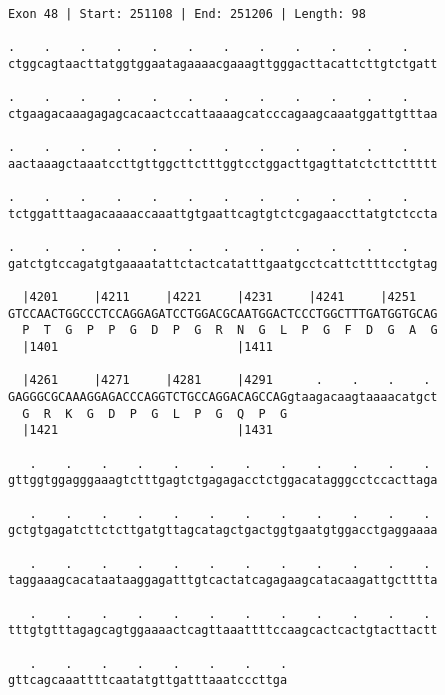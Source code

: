 \documentclass{article}
\begin{document}
\begin{Verbatim}[fontfamily=courier]
Exon 48 | Start: 251108 | End: 251206 | Length: 98

.    .    .    .    .    .    .    .    .    .    .    .    
ctggcagtaacttatggtggaatagaaaacgaaagttgggacttacattcttgtctgatt

.    .    .    .    .    .    .    .    .    .    .    .    
ctgaagacaaagagagcacaactccattaaaagcatcccagaagcaaatggattgtttaa

.    .    .    .    .    .    .    .    .    .    .    .    
aactaaagctaaatccttgttggcttctttggtcctggacttgagttatctcttcttttt

.    .    .    .    .    .    .    .    .    .    .    .    
tctggatttaagacaaaaccaaattgtgaattcagtgtctcgagaaccttatgtctccta

.    .    .    .    .    .    .    .    .    .    .    .    
gatctgtccagatgtgaaaatattctactcatatttgaatgcctcattcttttcctgtag

  |4201     |4211     |4221     |4231     |4241     |4251   
GTCCAACTGGCCCTCCAGGAGATCCTGGACGCAATGGACTCCCTGGCTTTGATGGTGCAG
  P  T  G  P  P  G  D  P  G  R  N  G  L  P  G  F  D  G  A  G
  |1401                         |1411                       

  |4261     |4271     |4281     |4291      .    .    .    . 
GAGGGCGCAAAGGAGACCCAGGTCTGCCAGGACAGCCAGgtaagacaagtaaaacatgct
  G  R  K  G  D  P  G  L  P  G  Q  P  G                     
  |1421                         |1431                       

   .    .    .    .    .    .    .    .    .    .    .    . 
gttggtggagggaaagtctttgagtctgagagacctctggacatagggcctccacttaga

   .    .    .    .    .    .    .    .    .    .    .    . 
gctgtgagatcttctcttgatgttagcatagctgactggtgaatgtggacctgaggaaaa

   .    .    .    .    .    .    .    .    .    .    .    . 
taggaaagcacataataaggagatttgtcactatcagagaagcatacaagattgctttta

   .    .    .    .    .    .    .    .    .    .    .    . 
tttgtgtttagagcagtggaaaactcagttaaattttccaagcactcactgtacttactt

   .    .    .    .    .    .    .    .
gttcagcaaattttcaatatgttgatttaaatcccttga
\end{Verbatim}
\newpage
\end{document}
